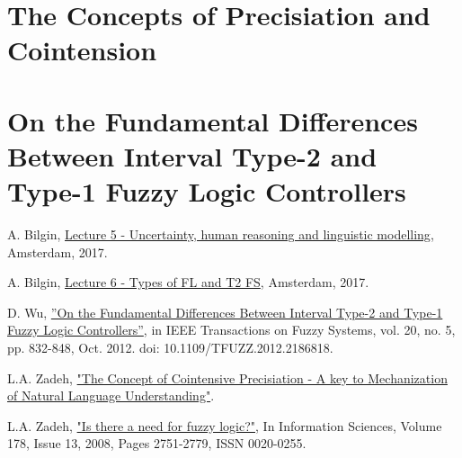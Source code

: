 \documentclass[11pt]{article}
\begin{document}
\section{The Concepts of Precisiation and Cointension}



\newpage
\section{On the Fundamental Differences Between Interval Type-2 and Type-1 Fuzzy Logic Controllers}


\newpage
\begin{thebibliography}{9}

    A. Bilgin,
    \href{https://drive.google.com/uc?id=1j505Rpb5mCb6EVXmwBEv5caM-nmYwecJ&authuser=0&export=download}{Lecture 5 - Uncertainty, human reasoning and linguistic modelling}, Amsterdam, 2017.

    A. Bilgin,
    \href{https://drive.google.com/uc?id=1cKJrc8KOdRhiMGHUycb2IEiU2ZFiOgsZ&authuser=0&export=download}{Lecture 6 - Types of FL and T2 FS}, Amsterdam, 2017.

    D. Wu,
    \href{http://ieeexplore.ieee.org/stamp/stamp.jsp?arnumber=6145645}{”On the Fundamental Differences Between Interval Type-2 and Type-1 Fuzzy Logic Controllers”}, in IEEE Transactions on Fuzzy Systems, vol. 20, no. 5, pp. 832-848, Oct. 2012. doi: 10.1109/TFUZZ.2012.2186818.

    L.A. Zadeh,
    \href{http://www.math.s.chiba-u.ac.jp/~yasuda/open2all/Paris06/IPMU2006/HTML/FINALPAPERS/P703.PDF}{"The Concept of Cointensive Precisiation - A key to Mechanization of Natural Language Understanding"}.

    L.A. Zadeh,
    \href{http://www.sciencedirect.com/science/article/pii/S0020025508000716}{"Is there a need for fuzzy logic?"}, In Information Sciences, Volume 178, Issue 13, 2008, Pages 2751-2779, ISSN 0020-0255.

\end{thebibliography}
\end{document}
